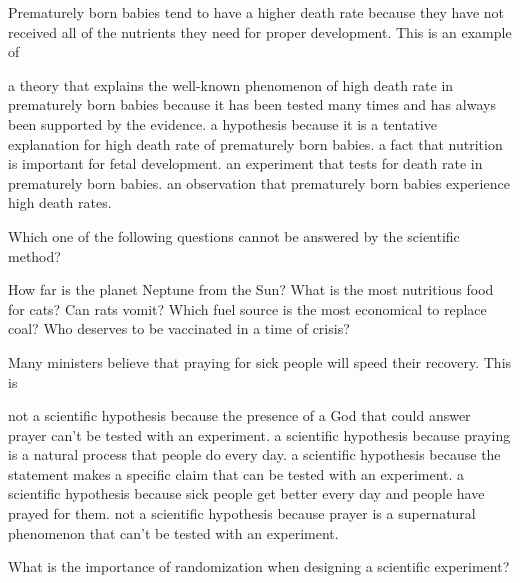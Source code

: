\question
Prematurely born babies tend to have a higher death rate because they have not received all of the nutrients they need for proper development. This is an example of

\begin{choices}
\choice a theory that explains the well-known phenomenon of high death rate in prematurely born babies because it has been tested many times and has always been supported by the evidence.%
\correctchoice a hypothesis because it is a tentative explanation for high death rate of prematurely born babies.%
\choice a fact that nutrition is important for fetal development.%
\choice an experiment that tests for death rate in prematurely born babies.%
\choice an observation that prematurely born babies experience high death rates.%
\end{choices}

\question
Which one of the following questions cannot be answered by the scientific method?

\begin{choices}
\choice How far is the planet Neptune from the Sun?%
\choice What is the most nutritious food for cats?%
\choice Can rats vomit?%
\choice Which fuel source is the most economical to replace coal?%
\correctchoice Who deserves to be vaccinated in a time of crisis?%
\end{choices}

\question
Many ministers believe that praying for sick people will speed their recovery.  This is

\begin{choices}
\choice not a scientific hypothesis because the presence of a God that could answer prayer can't be tested with an experiment.%
\choice a scientific hypothesis because praying is a natural process that people do every day.%
\correctchoice a scientific hypothesis because the statement makes a specific claim that can be tested with an experiment.%
\choice a scientific hypothesis because sick people get better every day and people have prayed for them.%
\choice not a scientific hypothesis because prayer is a supernatural phenomenon that can't be tested with an experiment.%
\end{choices}

\question
What is the importance of randomization when designing a scientific experiment?

